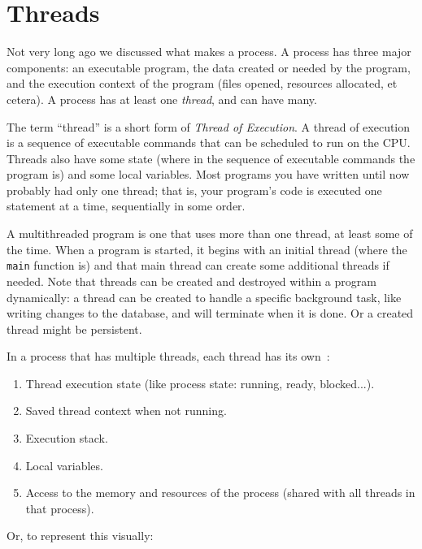




\section*{Threads}

Not very long ago we discussed what makes a process. A process has three major components: an executable program, the data created or needed by the program, and the execution context of the program (files opened, resources allocated, et cetera). A process has at least one \textit{thread}, and can have many.

The term ``thread'' is a short form of \textit{Thread of Execution}. A thread of execution is a sequence of executable commands that can be scheduled to run on the CPU. Threads also have some state (where in the sequence of executable commands the program is) and some local variables. Most programs you have written until now probably had only one thread; that is, your program's code is executed one statement at a time, sequentially in some order.

A multithreaded program is one that uses more than one thread, at least some of the time. When a program is started, it begins with an initial thread (where the \texttt{main} function is) and that main thread can create some additional threads if needed. Note that threads can be created and destroyed within a program dynamically: a thread can be created to handle a specific background task, like writing changes to the database, and will terminate when it is done. Or a created thread might be persistent.

In a process that has multiple threads, each thread has its own~\cite{osi}:
\begin{enumerate}
	\item Thread execution state (like process state: running, ready, blocked...).
	\item Saved thread context when not running.
	\item Execution stack.
	\item Local variables.
	\item Access to the memory and resources of the process (shared with all threads in that process).
\end{enumerate}

Or, to represent this visually:

